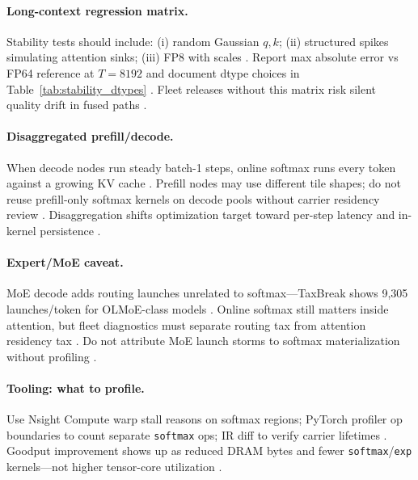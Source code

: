 \paragraph{Long-context regression matrix.} Stability tests should include: (i) random Gaussian $q,k$; (ii) structured spikes simulating attention sinks; (iii) FP8 with scales \citep{liu2024deepseekv3,patel2025llminference}. Report max absolute error vs FP64 reference at $T=8192$ and document dtype choices in Table~\ref{tab:stability_dtypes} \citep{dao2023flashdecoding,yirage2026}. Fleet releases without this matrix risk silent quality drift in fused paths \citep{chen2020compilerbasedhardw}.

\paragraph{Disaggregated prefill/decode.} When decode nodes run steady batch-1 steps, online softmax runs every token against a growing KV cache \citep{patel2025llminference,kwon2023vllm}. Prefill nodes may use different tile shapes; do not reuse prefill-only softmax kernels on decode pools without carrier residency review \citep{dao2023flashdecoding,taxbreak2026}. Disaggregation shifts optimization target toward per-step latency and in-kernel persistence \citep{memoryfloor2026}.

\paragraph{Expert/MoE caveat.} MoE decode adds routing launches unrelated to softmax---TaxBreak shows 9,305 launches/token for OLMoE-class models \citep{taxbreak2026}. Online softmax still matters inside attention, but fleet diagnostics must separate routing tax from attention residency tax \citep{patel2025llminference,liu2024deepseekv3}. Do not attribute MoE launch storms to softmax materialization without profiling \citep{taxbreak2026}.

\paragraph{Tooling: what to profile.} Use Nsight Compute warp stall reasons on softmax regions; PyTorch profiler op boundaries to count separate \texttt{softmax} ops; IR diff to verify carrier lifetimes \citep{patel2025llminference,chen2020compilerbasedhardw}. Goodput improvement shows up as reduced DRAM bytes and fewer \texttt{softmax}/\texttt{exp} kernels---not higher tensor-core utilization \citep{memoryfloor2026,taxbreak2026}.

